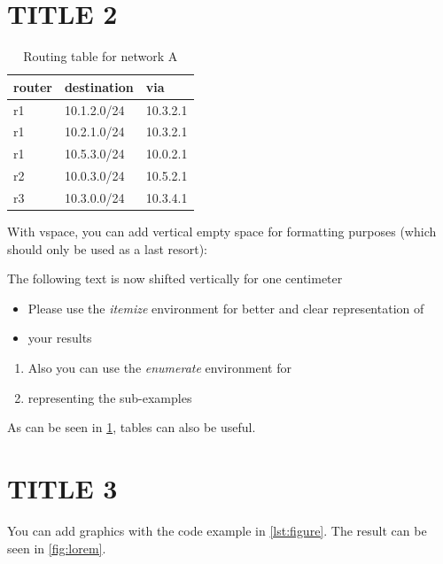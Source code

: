 \documentclass[parskip=full]{scrartcl}
\begin{document}
\section{TITLE 2}
\begin{table}[hb]
    \centering
    \caption{Routing table for network A}
    \label{tab:routing}
    \begin{tabular}{lll}
        \toprule
        \textbf{router} & \textbf{destination} & \textbf{via}  \\ \midrule
        r1 & 10.1.2.0/24 & 10.3.2.1 \\
        r1 & 10.2.1.0/24 & 10.3.2.1 \\
        r1 & 10.5.3.0/24 & 10.0.2.1 \\
        \midrule
        r2 & 10.0.3.0/24 & 10.5.2.1 \\
        \midrule
        r3 & 10.3.0.0/24 & 10.3.4.1 \\
        \bottomrule
    \end{tabular}
\end{table}
With vspace, you can add vertical empty space for formatting purposes (which should only be used as a last resort):
\vspace*{1cm}

The following text is now shifted vertically for one centimeter

\begin{itemize}
\item Please use the \textit{itemize} environment for better and clear representation of
\item your results
\end{itemize}

\begin{enumerate}
\item Also you can use the \textit{enumerate} environment for 
\item representing the sub-examples
\end{enumerate}

As can be seen in \cref{tab:routing}, tables can also be useful.
\section{TITLE 3}

You can add graphics with the code example in \cref{lst:figure}. The result can be seen in \cref{fig:lorem}.
\end{document}
